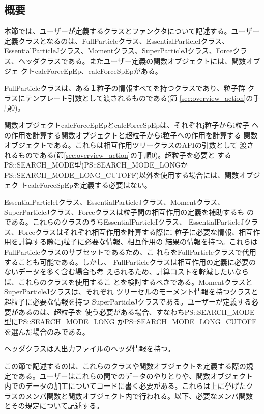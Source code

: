 \subsection{概要}

本節では、ユーザーが定義するクラスとファンクタについて記述する。ユーザー
定義クラスとなるのは、FullParticleクラス、EssentialParticleIクラス、
EssentialParticleJクラス、Momentクラス、SuperParticleJクラス、Forceクラ
ス、ヘッダクラスである。またユーザー定義の関数オブジェクトには、関数オブジェ
クトcalcForceEpEp、calcForceSpEpがある。

FullParticleクラスは、ある１粒子の情報すべてを持つクラスであり、粒子群
クラスにテンプレート引数として渡されるものである(節
\ref{sec:overview_action}の手順0)。

関数オブジェクトcalcForceEpEpとcalcForceSpEpは、それぞれj粒子からi粒子
への作用を計算する関数オブジェクトと超粒子からi粒子への作用を計算する
関数オブジェクトである。これらは相互作用ツリークラスのAPIの引数として
渡されるものである(節\ref{sec:overview_action}の手順0)。超粒子を必要と
するPS::SEARCH\_MODE型(PS::SEARCH\_MODE\_LONGか
PS::SEARCH\_MODE\_LONG\_CUTOFF)以外を使用する場合には、関数オブジェク
トcalcForceSpEpを定義する必要はない。

EssentialParticleIクラス、EssentialParticleJクラス、Momentクラス、
SuperParticleJクラス、Forceクラスは粒子間の相互作用の定義を補助するも
のである。これらのクラスのうちEssentialParticleIクラス、
EssentialParticleJクラス、Forceクラスはそれぞれ相互作用を計算する際にi
粒子に必要な情報、相互作用を計算する際にj粒子に必要な情報、相互作用の
結果の情報を持つ。これらはFullParticleクラスのサブセットであるため、こ
れらをFullParticleクラスで代用することも可能である。しかし、
FullParticleクラスは相互作用の定義に必要のないデータを多く含む場合も考
えられるため、計算コストを軽減したいならば、これらのクラスを使用するこ
とを検討するべきである。MomentクラスとSuperParticleJクラスは、それぞれ
ツリーセルのモーメント情報を持つクラスと超粒子に必要な情報を持つ
SuperParticleJクラスである。ユーザーが定義する必要があるのは、超粒子を
使う必要がある場合、すなわちPS::SEARCH\_MODE型にPS::SEARCH\_MODE\_LONG
かPS::SEARCH\_MODE\_LONG\_CUTOFFを選んだ場合のみである。

ヘッダクラスは入出力ファイルのヘッダ情報を持つ。

この節で記述するのは、これらのクラスや関数オブジェクトを定義する際の規
定である。ユーザーはこれらの間でのデータのやりとりや、関数オブジェクト
内でのデータの加工についてコードに書く必要がある。これらは上に挙げたク
ラスのメンバ関数と関数オブジェクト内で行われる。以下、必要なメンバ関数
とその規定について記述する。

